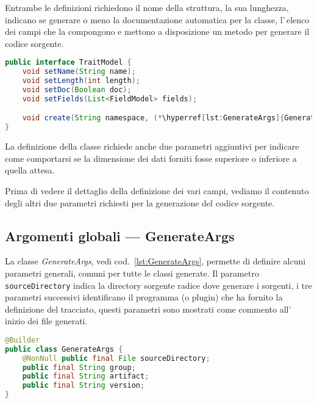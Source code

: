 \documentclass[a4paper,10pt]{report}
\begin{document}
Entrambe le definizioni richiedono il nome della struttura, la sua
lunghezza, indicano se generare o meno la documentazione automatica per la 
classe, l'\,elenco dei campi che la compongono e mettono a disposizione un 
metodo per generare il codice sorgente.

\begin{figure*}[!htb]
\begin{lstlisting}[language=java, caption=interfaccia TraitModel, 
label=lst:TraitModel]
public interface TraitModel {
    void setName(String name);
    void setLength(int length);
    void setDoc(Boolean doc);
    void setFields(List<FieldModel> fields);

    void create(String namespace, (*\hyperref[lst:GenerateArgs]{GenerateArgs}*) ga, (*\hyperref[lst:FieldDefault]{FieldDefault}*) defaults);
}
\end{lstlisting}
\end{figure*}
La definizione della classe richiede anche due parametri aggiuntivi per indicare
come comportarsi se la dimensione dei dati forniti fosse superiore o inferiore a
quella attesa.

Prima di vedere il dettaglio della definizione dei vari campi, vediamo il 
contenuto degli altri due parametri richiesti per la generazione del codice
sorgente.

\subsection{Argomenti globali --- GenerateArgs}
La classe \textsl{GenerateArgs}, vedi cod.~\ref{lst:GenerateArgs}, permette di
definire alcuni parametri generali, comuni per tutte le classi generate.
Il parametro \texttt{sourceDirectory} indica la directory sorgente radice dove 
generare i sorgenti, i tre parametri successivi identificano il programma 
(o plugin) che ha fornito la definizione del tracciato, questi parametri sono 
mostrati come commento all'\,inizio dei file generati.

\begin{figure*}[!htb]
\begin{lstlisting}[language=java, caption=interfaccia GenerateArgs, 
label=lst:GenerateArgs]
@Builder
public class GenerateArgs {
    @NonNull public final File sourceDirectory;
    public final String group;
    public final String artifact;
    public final String version;
}
\end{lstlisting}
\end{figure*}
\end{document}
